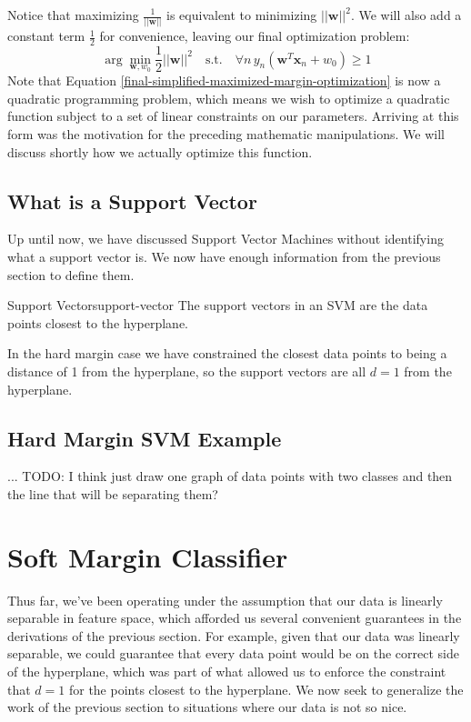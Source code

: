 Notice that maximizing $\frac{1}{||\textbf{w}||}$ is equivalent to minimizing $||\textbf{w}||^{2}$. We will also add a constant term $\frac{1}{2}$ for convenience, leaving our final optimization problem:
\begin{equation} \label{final-simplified-maximized-margin-optimization}
	\arg\min_{\textbf{w}, w_{0}} \frac{1}{2} ||\textbf{w}||^{2} \quad \text{s.t.} \quad \forall n \, y_{n}(\textbf{w}^{T}\textbf{x}_{n} + w_{0}) \geq 1
\end{equation}
Note that Equation \ref{final-simplified-maximized-margin-optimization} is now a quadratic programming problem, which means we wish to optimize a quadratic function subject to a set of linear constraints on our parameters. Arriving at this form was the motivation for the preceding mathematic manipulations. We will discuss shortly how we actually optimize this function.

\subsection{What is a Support Vector}
Up until now, we have discussed Support Vector Machines without identifying what a support vector is. We now have enough information from the previous section to define them.

\begin{definition}{Support Vector}{support-vector}
The support vectors in an SVM are the data points closest to the hyperplane.
\end{definition}

In the hard margin case we have constrained the closest data points to being a distance of 1 from the hyperplane, so the support vectors are all $d=1$ from the hyperplane.


\subsection{Hard Margin SVM Example}
... TODO: I think just draw one graph of data points with two classes and then the line that will be separating them?

\section{Soft Margin Classifier}
Thus far, we've been operating under the assumption that our data is linearly separable in feature space, which afforded us several convenient guarantees in the derivations of the previous section. For example, given that our data was linearly separable, we could guarantee that every data point would be on the correct side of the hyperplane, which was part of what allowed us to enforce the constraint that $d=1$ for the points closest to the hyperplane. We now seek to generalize the work of the previous section to situations where our data is not so nice.

